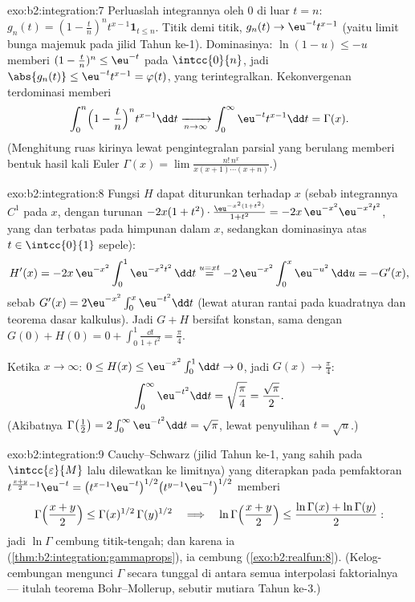 \begin{solution}{exo:b2:integration:7}
Perluaslah integrannya oleh $0$ di luar $t = n$: $g_n(t) = (1 -
\frac tn)^n t^{x-1}\mathbf{1}_{t \leq n}$. Titik demi titik, $g_n(t) \to
\eu^{-t}t^{x-1}$ (yaitu limit bunga majemuk pada jilid Tahun ke-1).
Dominasinya: $\ln(1 - u) \leq -u$ memberi $(1 - \frac tn)^n \leq
\eu^{-t}$ pada $\intcc{0}{n}$, jadi $\abs{g_n(t)} \leq
\eu^{-t}t^{x-1} = \varphi(t)$, yang terintegralkan. Kekonvergenan
terdominasi memberi
\[
\int_0^n \Bigl(1 - \frac tn\Bigr)^n t^{x-1}\dd t
\xrightarrow[n\to\infty]{} \int_0^\infty \eu^{-t}t^{x-1}\dd t
= \Gamma(x) .
\]
(Menghitung ruas kirinya lewat pengintegralan parsial yang berulang memberi
bentuk hasil kali Euler $\Gamma(x) = \lim \frac{n!\,n^x}{x(x+1)\cdots(x+n)}$.)
\end{solution}

\begin{solution}{exo:b2:integration:8}
Fungsi $H$ dapat diturunkan terhadap $x$ (sebab integrannya $C^1$ pada
$x$, dengan turunan $-2x(1+t^2)\cdot\frac{\eu^{-x^2(1+t^2)}}{1+t^2} =
-2x\,\eu^{-x^2}\eu^{-x^2t^2}$, yang  dan terbatas pada himpunan
 dalam $x$, sedangkan dominasinya atas $t \in \intcc{0}{1}$ sepele):
\[
H'(x) = -2x\,\eu^{-x^2}\int_0^1 \eu^{-x^2t^2}\,\dd t
\overset{u = xt}{=} -2\,\eu^{-x^2}\int_0^x \eu^{-u^2}\,\dd u
= -G'(x),
\]
sebab $G'(x) = 2\eu^{-x^2}\int_0^x \eu^{-t^2}\dd t$ (lewat aturan rantai
pada kuadratnya dan teorema dasar kalkulus). Jadi $G + H$ bersifat
konstan, sama dengan $G(0) + H(0) = 0 + \int_0^1 \frac{\dd t}{1+t^2}
= \frac\pi4$.

Ketika $x \to \infty$: $0 \leq H(x) \leq \eu^{-x^2}\int_0^1 \dd t \to
0$, jadi $G(x) \to \frac\pi4$:
\[
\int_0^\infty \eu^{-t^2}\dd t = \sqrt{\frac\pi4} =
\frac{\sqrt\pi}{2} .
\]
(Akibatnya $\Gamma\bigl(\frac12\bigr) = 2\int_0^\infty
\eu^{-t^2}\dd t = \sqrt\pi$, lewat penyulihan $t = \sqrt u$.)
\end{solution}

\begin{solution}{exo:b2:integration:9}
Cauchy--Schwarz (jilid Tahun ke-1, yang sahih pada
$\intcc{\varepsilon}{M}$ lalu dilewatkan ke limitnya) yang diterapkan
pada pemfaktoran $t^{\frac{x+y}{2}-1}\eu^{-t} =
\bigl(t^{x-1}\eu^{-t}\bigr)^{1/2}
\bigl(t^{y-1}\eu^{-t}\bigr)^{1/2}$ memberi
\[
\Gamma\Bigl(\frac{x+y}{2}\Bigr) \leq
\Gamma(x)^{1/2}\,\Gamma(y)^{1/2}
\quad\Longrightarrow\quad
\ln\Gamma\Bigl(\frac{x+y}{2}\Bigr) \leq \frac{\ln\Gamma(x) +
\ln\Gamma(y)}{2} :
\]
jadi $\ln\Gamma$ cembung titik-tengah; dan karena ia 
(\cref{thm:b2:integration:gammaprops}), ia cembung
(\cref{exo:b2:realfun:8}). (Kelog-cembungan mengunci $\Gamma$
secara tunggal di antara semua interpolasi faktorialnya --- itulah
teorema Bohr--Mollerup, sebutir mutiara Tahun ke-3.)
\end{solution}

